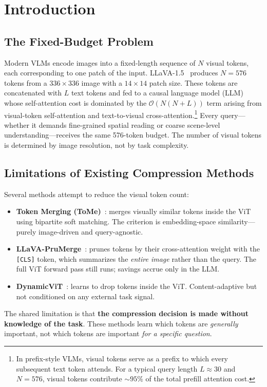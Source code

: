 \documentclass[11pt,a4paper]{article}
\begin{document}
\tableofcontents
\newpage

\section{Introduction}
\label{sec:intro}

\subsection{The Fixed-Budget Problem}

Modern VLMs encode images into a fixed-length sequence of $N$ visual tokens,
each corresponding to one patch of the input.
LLaVA-1.5~\citep{liu2024llava} produces $N{=}576$ tokens from a
$336{\times}336$ image with a $14{\times}14$ patch size.
These tokens are concatenated with $L$ text tokens and fed to a causal
language model (LLM) whose self-attention cost is dominated by the
$\mathcal{O}(N(N{+}L))$ term arising from visual-token self-attention and
text-to-visual cross-attention.\footnote{
  In prefix-style VLMs, visual tokens serve as a prefix to which every
  subsequent text token attends.
  For a typical query length $L \approx 30$ and $N{=}576$, visual tokens
  contribute $\sim\!95\%$ of the total prefill attention cost.
}
Every query---whether it demands fine-grained spatial reading or coarse
scene-level understanding---receives the same 576-token budget.
The number of visual tokens is determined by image resolution, not by task
complexity.

\subsection{Limitations of Existing Compression Methods}

Several methods attempt to reduce the visual token count:
\begin{itemize}[leftmargin=1.5em, itemsep=2pt]
  \item \textbf{Token Merging (ToMe)}~\citep{bolya2022token}: merges
    visually similar tokens inside the ViT using bipartite soft matching.
    The criterion is embedding-space similarity---purely image-driven and
    query-agnostic.
  \item \textbf{LLaVA-PruMerge}~\citep{shang2024llava}: prunes tokens by
    their cross-attention weight with the \texttt{[CLS]} token, which
    summarizes the \emph{entire image} rather than the query.
    The full ViT forward pass still runs; savings accrue only in the LLM.
  \item \textbf{DynamicViT}~\citep{rao2021dynamicvit}: learns to drop
    tokens inside the ViT.
    Content-adaptive but not conditioned on any external task signal.
\end{itemize}
The shared limitation is that \textbf{the compression decision is made
without knowledge of the task}.
These methods learn which tokens are \emph{generally} important, not which
tokens are important \emph{for a specific question}.
\end{document}

